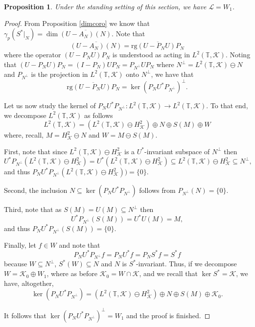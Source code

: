 \documentclass[a4paper,12pt]{amsart}
\def\KK{{\mathcal{K}}}
\def\T{{\mathbb{T}}}
\newtheorem{proposition}[theorem]{Proposition}
\theoremstyle{definition}
\begin{document}
\begin{proposition}\label{dimcoro2}
Under the standing setting of this section, we have $\mathcal{L} = W_1$.\end{proposition}
\begin{proof}
From Proposition \ref{dimcoro} we know that $\gamma_p(S^*|_N)=\dim\overline{(U-A_N)(N)}$. Note that
\begin{equation*}
\overline{(U-A_N)(N)}=\overline{\text{rg}(U-P_NU)P_N}
\end{equation*}
where the operator $(U-P_NU)P_N$ is understood as acting in $L^2(\T,\KK)$. Noting that $(U-P_NU)P_N=(I-P_N)UP_N=P_{N^\perp} UP_N$ where $N^\perp=L^2(\T,\KK)\ominus N$ and $P_{N^\perp}$ is the projection in $L^2(\T,\KK)$ onto $N^\perp$, we have that
\begin{equation*}
\overline{\text{rg}(U-P_NU)P_N}=\ker(P_NU^*P_{N^\perp})^\perp.
\end{equation*}

Let us now study the kernel of $P_NU^*P_{N^\perp}:L^2(\T,\KK)\to L^2(\T,\KK)$. To that end, we decompose $L^2(\T,\KK)$ as follows
\begin{equation*}
L^2(\T,\KK)=\left(L^2(\T,\KK)\ominus H^2_\KK\right)\oplus N\oplus S(M)\oplus W
\end{equation*}
where, recall, $M=H^2_\KK\ominus N$ and $W=M\ominus S(M)$. 

First, note that since $L^2(\T,\KK)\ominus H^2_\KK$ is a $U^*$-invariant subspace of $N^\perp$ then
\begin{equation*}
U^*P_{N^\perp}(L^2(\T,\KK)\ominus H^2_\KK)=U^*(L^2(\T,\KK)\ominus H^2_\KK)\subseteq L^2(\T,\KK)\ominus H^2_\KK\subseteq N^\perp,
\end{equation*}
and thus $P_NU^*P_{N^\perp}(L^2(\T,\KK)\ominus H^2_\KK))=\{0\}$. 

Second, the inclusion $N\subseteq\ker(P_NU^*P_{N^\perp})$ follows from $P_{N^\perp}(N)=\{0\}$. 

Third, note that as $S(M)=U(M)\subseteq N^\perp$ then
\begin{equation*}
U^*P_{N^\perp}(S(M)) =U^*U(M)=M,
\end{equation*}
and thus $P_NU^*P_{N^\perp}(S(M))=\{0\}$.

Finally, let $f\in W$ and note that
\begin{equation*}
P_NU^*P_{N^\perp} f=P_NU^*f=P_NS^*f=S^*f
\end{equation*} 
because $W\subseteq N^\perp$, $S^*(W)\subseteq N$ and $N$ is $S^*$-invariant. Thus, if we decompose $W=\KK_0\oplus W_1$, where as before $\KK_0=W\cap\KK$, and we recall that $\ker S^*=\KK$, we have, altogether,
\begin{equation*}
\ker(P_NU^*P_{N^\perp})=\left(L^2(\T,\KK)\ominus H^2_\KK\right)\oplus N\oplus S(M)\oplus \KK_0.
\end{equation*}



It follows that $\ker(P_NU^*P_{N^\perp})^\perp=W_1$ and the proof is finished.
\end{proof}
\end{document}
